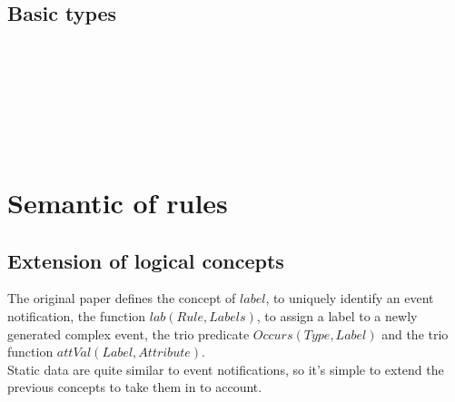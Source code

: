 \subsection{Basic types}
\begin{bnf*}
\\
\\
\\
\\
\\
\\
\end{bnf*}



\section{Semantic of rules}

\subsection{Extension of logical concepts}
The original paper defines the concept of $label$, to uniquely identify an event notification, the function $lab(Rule, Labels)$, to assign a label to a newly generated complex event, the trio predicate $Occurs(Type, Label)$ and the trio function $attVal(Label, Attribute)$.\\
Static data are quite similar to event notifications, so it's simple to extend the previous concepts to take them in to account.

